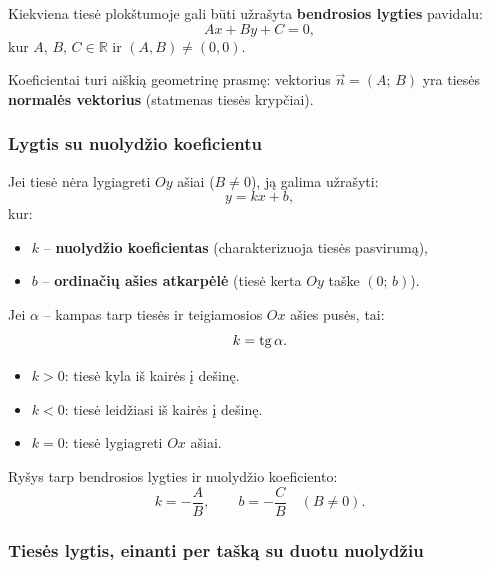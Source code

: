 \begin{definition}
Kiekviena tiesė plokštumoje gali būti užrašyta \textbf{bendrosios lygties} pavidalu:
\[
    Ax + By + C = 0,
\]
kur $A$, $B$, $C \in \mathbb{R}$ ir $(A, B) \neq (0, 0)$.
\end{definition}

Koeficientai turi aiškią geometrinę prasmę: vektorius $\vec{n} = (A;\, B)$ yra tiesės \textbf{normalės vektorius} (statmenas tiesės krypčiai).

\subsubsection*{Lygtis su nuolydžio koeficientu}

\begin{definition}
Jei tiesė nėra lygiagreti $Oy$ ašiai ($B \neq 0$), ją galima užrašyti:
\[
    y = kx + b,
\]
kur:
\begin{itemize}
    \item $k$ – \textbf{nuolydžio koeficientas} (charakterizuoja tiesės pasvirumą),
    \item $b$ – \textbf{ordinačių ašies atkarpėlė} (tiesė kerta $Oy$ taške $(0;\, b)$).
\end{itemize}
\end{definition}

\begin{definition}
Jei $\alpha$ – kampas tarp tiesės ir teigiamosios $Ox$ ašies pusės, tai:
\[
    k = \operatorname{tg} \alpha.
\]
\begin{itemize}
    \item $k > 0$: tiesė kyla iš kairės į dešinę.
    \item $k < 0$: tiesė leidžiasi iš kairės į dešinę.
    \item $k = 0$: tiesė lygiagreti $Ox$ ašiai.
\end{itemize}
\end{definition}

Ryšys tarp bendrosios lygties ir nuolydžio koeficiento:
\[
    k = -\frac{A}{B}, \qquad b = -\frac{C}{B} \quad (B \neq 0).
\]

\subsubsection*{Tiesės lygtis, einanti per tašką su duotu nuolydžiu}

